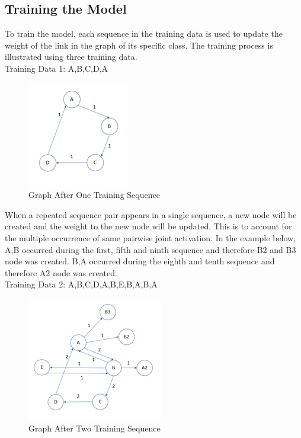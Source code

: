 \documentclass[conference]{IEEEtran}
\begin{document}
\subsection{Training the Model}

To train the model, each sequence in the training data is used to update the weight of the link in the graph of its specific class. The training process is illustrated using three training data. \\

Training Data 1: A,B,C,D,A

\begin{figure}[H]
\begin{center}
\includegraphics[scale=1]{Image/Graph1.png}
\caption{\label{fig:Graph1} Graph After One Training Sequence}
\end{center}
\end{figure}

When a repeated sequence pair appears in a single sequence, a new node will be created and the weight to the new node will be updated. This is to account for the multiple occurrence of same pairwise joint activation. In the example below, A,B occurred during the first, fifth and ninth sequence and therefore B2 and B3 node was created. B,A occurred during the eighth and tenth sequence and therefore A2 node was created.\\

Training Data 2: A,B,C,D,A,B,E,B,A,B,A

\begin{figure}[H]
\begin{center}
\includegraphics[scale=1]{Image/Graph2.png}
\caption{\label{fig:Graph2} Graph After Two Training Sequence}
\end{center}
\end{figure}
\end{document}
